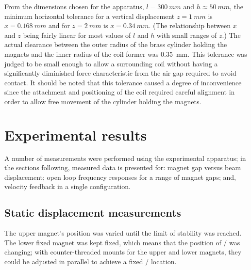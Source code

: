 \documentclass[11pt,a4paper]{memoir}
\begin{document}
From the dimensions chosen for the apparatus, $l=\SI{300}{mm}$ and
$h\approx\SI{50}{mm}$, the minimum horizontal tolerance for a vertical
displacement $z=\SI{1}{mm}$ is $x=\SI{0.168}{mm}$ and for $z=\SI{2}{mm}$ is
$x=\SI{0.34}{mm}$. (The relationship between $x$ and $z$ being fairly linear for
most values of $l$ and $h$ with small ranges of $z$.)
The actual clearance between the outer radius of the brass cylinder holding the magnets and the inner radius of the coil former was \SI{0.35}{mm}.
This tolerance was judged to be small enough to allow a surrounding coil without having a
significantly diminished force characteristic from the air gap required to
avoid contact.
It should be noted that this tolerance caused a degree of inconvenience since the attachment and positioning of the coil required careful alignment in order to allow free movement of the cylinder holding the magnets.

\section{Experimental results}

A number of measurements were performed using the experimental apparatus;
in the sections following, measured data is presented for:
magnet gap versus beam displacement;
open loop frequency responses for a range of magnet gaps; and,
velocity feedback in a single configuration.

\subsection{Static displacement measurements}

The upper magnet's position was varied until the limit of stability was
reached. The lower fixed magnet was kept fixed, which means that the position
of \qzs/ was changing; with counter-threaded mounts for the upper and lower
magnets, they could be adjusted in parallel to achieve a fixed \qzs/ location.
\end{document}
